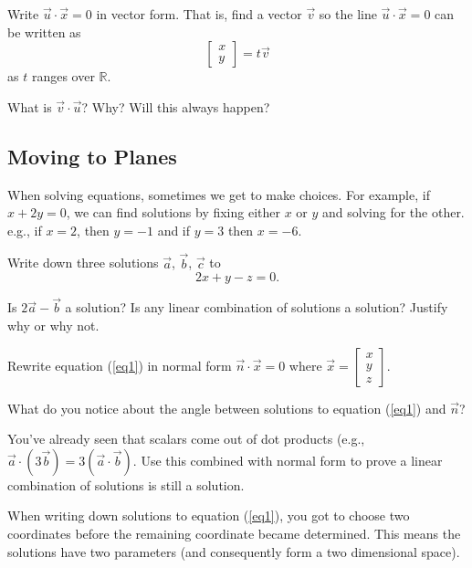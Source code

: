 \documentclass[letter]{article}
\newcommand{\R}{\mathbb{R}}
\begin{document}
	\begin{Enum}
		\item Write $\vec u\cdot \vec x=0$ in vector form.  That is, find a vector $\vec v$ so
		the line $\vec u\cdot \vec x=0$  can be written as
		\[
			\begin{bmatrix}x\\y\end{bmatrix} = t\vec v
		\]
		as $t$ ranges over $\R$.
		\item What is $\vec v\cdot \vec u$? Why? Will this always happen?
	\end{Enum}

	\subsection*{Moving to Planes}
	When solving equations, sometimes we get to make choices. For example, 
	if $x+2y=0$, we can find solutions by fixing either $x$ or $y$ and solving
	for the other. e.g., if $x=2$, then $y=-1$ and if $y=3$ then $x=-6$.

	\begin{Enum}
		\item Write down three solutions $\vec a$, $\vec b$, $\vec c$ to
		\begin{equation}\label{eq1}
			2x+y-z=0.
		\end{equation}
		\item Is $2\vec a-\vec b$ a solution?  Is any linear combination of solutions a solution?  Justify why or why not.
		\item Rewrite equation (\ref{eq1}) in normal form $\vec n\cdot \vec x=0$ where $\vec x=\begin{bmatrix}x\\ y\\ z\end{bmatrix}$.
		\item What do you notice about the angle between solutions to equation (\ref{eq1}) and $\vec n$?
		\item You've already seen that scalars come out of dot products (e.g., $\vec a\cdot(3\vec b) = 3(\vec a\cdot \vec b)$.
		Use this combined with normal form to prove a linear combination of solutions is still a solution.
	\end{Enum}

	When writing down solutions to equation (\ref{eq1}), you got to choose two coordinates before the remaining
	coordinate became determined.  This means the solutions have two parameters (and consequently form a
	two dimensional space).
\end{document}
